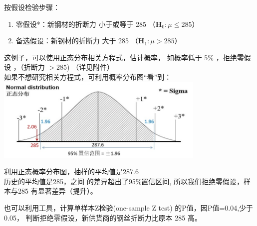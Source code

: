 按假设检验步骤：

\begin{enumerate}
\tightlist
\item
  零假设*：新钢材的折断力 小于或等于 285
  （\(\mathbf{H}_0: \mu \le 285\)）
\item
  备选假设：新钢材的折断力 大于 285 （\(\mathbf{H}_1: \mu > 285\)）
\end{enumerate}

\begin{description}
\item[]
\end{description}

这例子，可以使用正态分布相关方程式，估计概率， 如概率低于 5\%
，拒绝零假设 ，（折断力 \(> 285\)) （详见附件）\\
如果不想研究相关方程式，可利用概率分布图``看''到：\\

\includegraphics[width=10cm]{M4SingleMean1Screenshot_2022-09-11_201026.jpg}

利用正态概率分布图，抽样的平均值是287.6\\
历史的平均值是285，之间 的差异超出了95\%置信区间,
所以我们拒绝零假设，样本与285 有显著差异（提升）。

也可以利用工具，计算单样本Z检验(one-sample Z test)
的P值，因P值=0.04,少于0.05， 判断拒绝零假设，新供货商的钢丝折断力比原本
285 高。

